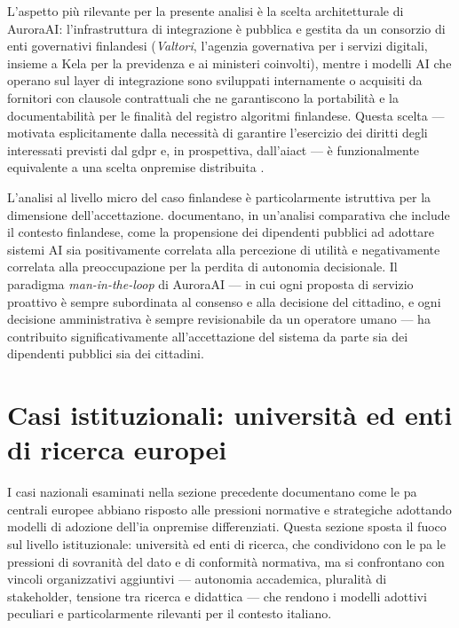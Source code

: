 L'aspetto più rilevante per la presente analisi è la scelta architetturale di AuroraAI:
l'infrastruttura di integrazione è pubblica e gestita da un consorzio di enti
governativi finlandesi (\textit{Valtori}, l'agenzia governativa per i servizi
digitali, insieme a Kela per la previdenza e ai ministeri coinvolti), mentre
i modelli AI che operano sul layer di integrazione sono sviluppati internamente
o acquisiti da fornitori con clausole contrattuali che ne garantiscono la portabilità
e la documentabilità per le finalità del registro algoritmi finlandese.
Questa scelta --- motivata esplicitamente dalla necessità di garantire l'esercizio
dei diritti degli interessati previsti dal \gls{gdpr} e, in prospettiva, dall'\gls{aiact} ---
è funzionalmente equivalente a una scelta \gls{onpremise} distribuita
\parencite{EnqvistLena2024}.

L'analisi al livello micro del caso finlandese è particolarmente
istruttiva per la dimensione dell'accettazione. \textcite{Ahn2022} documentano,
in un'analisi comparativa che include il contesto finlandese, come la propensione
dei dipendenti pubblici ad adottare sistemi AI sia positivamente correlata alla
percezione di utilità e negativamente correlata alla preoccupazione per la
perdita di autonomia decisionale. Il paradigma \textit{man-in-the-loop} di AuroraAI
--- in cui ogni proposta di servizio proattivo è sempre subordinata al consenso
e alla decisione del cittadino, e ogni decisione amministrativa è sempre revisionabile
da un operatore umano --- ha contribuito significativamente all'accettazione del
sistema da parte sia dei dipendenti pubblici sia dei cittadini.

\section{Casi istituzionali: università ed enti di ricerca europei}
\label{sec:casi-istituzionali}

I casi nazionali esaminati nella sezione precedente documentano come le \gls{pa} centrali
europee abbiano risposto alle pressioni normative e strategiche adottando modelli di
adozione dell'\gls{ia} \gls{onpremise} differenziati. Questa sezione sposta il fuoco
sul livello istituzionale: università ed enti di ricerca, che condividono
con le \gls{pa} le pressioni di sovranità del dato e di conformità normativa, ma si
confrontano con vincoli organizzativi aggiuntivi --- autonomia accademica, pluralità
di stakeholder, tensione tra ricerca e didattica --- che rendono i modelli adottivi
peculiari e particolarmente rilevanti per il contesto italiano.

